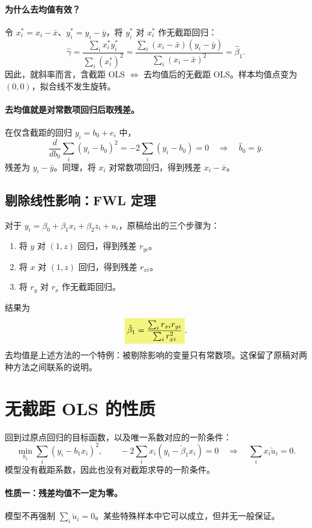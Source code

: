 \paragraph{为什么去均值有效？}
令 $x_i^*=x_i-\bar x$、$y_i^*=y_i-\bar y$，将 $y_i^*$ 对 $x_i^*$ 作无截距回归：
\[\hat\gamma=\frac{\sum_i x_i^*y_i^*}{\sum_i(x_i^*)^2}
=\frac{\sum_i(x_i-\bar x)(y_i-\bar y)}{\sum_i(x_i-\bar x)^2}=\hat\beta_1.\]
因此，就斜率而言，含截距 OLS $\Longleftrightarrow$ 去均值后的无截距 OLS。样本均值点变为 $(0,0)$，拟合线不发生旋转。

\paragraph{去均值就是对常数项回归后取残差。}
在仅含截距的回归 $y_i=b_0+e_i$ 中，
\[\frac{d}{db_0}\sum_i(y_i-b_0)^2=-2\sum_i(y_i-b_0)=0
\quad\Longrightarrow\quad\hat b_0=\bar y.\]
残差为 $y_i-\bar y$。同理，将 $x_i$ 对常数项回归，得到残差 $x_i-\bar x$。

\subsection{剔除线性影响：FWL 定理}
\label{sec:fwl-week3}
对于 $y_i=\beta_0+\beta_1x_i+\beta_2z_i+u_i$，原稿给出的三个步骤为：
\begin{enumerate}
\item 将 $y$ 对 $(1,z)$ 回归，得到残差 $r_{yi}$。
\item 将 $x$ 对 $(1,z)$ 回归，得到残差 $r_{xi}$。
\item 将 $r_y$ 对 $r_x$ 作无截距回归。
\end{enumerate}
结果为
\[\hm{\hat\beta_1=\frac{\sum_i r_{xi}r_{yi}}{\sum_i r_{xi}^2}}.\]
去均值是上述方法的一个特例：被剔除影响的变量只有常数项。这保留了原稿对两种方法之间联系的说明。

\section{无截距 OLS 的性质}
\label{sec:rto-properties}
回到过原点回归的目标函数，以及唯一系数对应的一阶条件：
\[\min_{b_1}\sum_i(y_i-b_1x_i)^2,\qquad
-2\sum_i x_i(y_i-\check\beta_1x_i)=0
\quad\Longrightarrow\quad\sum_i x_i\check u_i=0.\]
模型没有截距系数，因此也没有对截距求导的一阶条件。

\paragraph{性质一：残差均值不一定为零。}
模型不再强制 $\sum_i\check u_i=0$。某些特殊样本中它可以成立，但并无一般保证。

